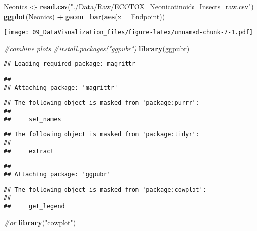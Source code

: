 \documentclass[]{article}
\newenvironment{Shaded}{\begin{snugshade}}{\end{snugshade}}
\newcommand{\CommentTok}[1]{\textcolor[rgb]{0.56,0.35,0.01}{\textit{#1}}}
\newcommand{\DataTypeTok}[1]{\textcolor[rgb]{0.13,0.29,0.53}{#1}}
\newcommand{\KeywordTok}[1]{\textcolor[rgb]{0.13,0.29,0.53}{\textbf{#1}}}
\newcommand{\NormalTok}[1]{#1}
\newcommand{\OperatorTok}[1]{\textcolor[rgb]{0.81,0.36,0.00}{\textbf{#1}}}
\newcommand{\StringTok}[1]{\textcolor[rgb]{0.31,0.60,0.02}{#1}}
\begin{document}
\begin{Shaded}
\begin{Highlighting}[]
\NormalTok{Neonics <-}\StringTok{ }\KeywordTok{read.csv}\NormalTok{(}\StringTok{"./Data/Raw/ECOTOX_Neonicotinoids_Insects_raw.csv"}\NormalTok{)}
\KeywordTok{ggplot}\NormalTok{(Neonics) }\OperatorTok{+}
\StringTok{  }\KeywordTok{geom_bar}\NormalTok{(}\KeywordTok{aes}\NormalTok{(}\DataTypeTok{x =}\NormalTok{ Endpoint))}
\end{Highlighting}
\end{Shaded}

\texttt{[image: 09\_DataVisualization\_files/figure-latex/unnamed-chunk-7-1.pdf]}

\begin{Shaded}
\begin{Highlighting}[]
\CommentTok{#combine plots}
\CommentTok{#install.packages("ggpubr")}
\KeywordTok{library}\NormalTok{(ggpubr)}
\end{Highlighting}
\end{Shaded}

\begin{verbatim}
## Loading required package: magrittr
\end{verbatim}

\begin{verbatim}
## 
## Attaching package: 'magrittr'
\end{verbatim}

\begin{verbatim}
## The following object is masked from 'package:purrr':
## 
##     set_names
\end{verbatim}

\begin{verbatim}
## The following object is masked from 'package:tidyr':
## 
##     extract
\end{verbatim}

\begin{verbatim}
## 
## Attaching package: 'ggpubr'
\end{verbatim}

\begin{verbatim}
## The following object is masked from 'package:cowplot':
## 
##     get_legend
\end{verbatim}

\begin{Shaded}
\begin{Highlighting}[]
\CommentTok{#or}
\KeywordTok{library}\NormalTok{(}\StringTok{"cowplot"}\NormalTok{)}
\end{Highlighting}
\end{Shaded}
\end{document}
